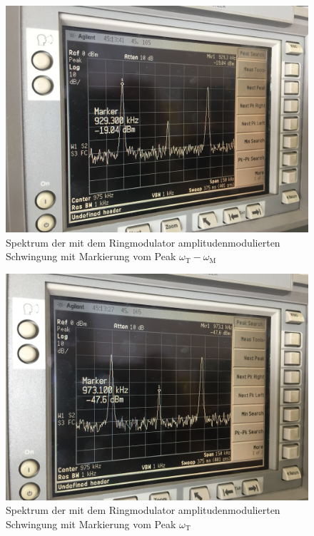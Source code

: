 \begin{figure}[h]
  \includegraphics[width=.9\textwidth]{Spektrum_Pics/b1.jpg}
  \caption{Spektrum der mit dem Ringmodulator amplitudenmodulierten Schwingung mit Markierung vom Peak $\omega_\text{T} - \omega_\text{M}$}
  \label{fig:b1}
\end{figure}
\begin{figure}[h]
  \includegraphics[width=.9\textwidth]{Spektrum_Pics/b2.jpg}
  \caption{Spektrum der mit dem Ringmodulator amplitudenmodulierten Schwingung mit Markierung vom Peak $\omega_\text{T}$}
  \label{fig:b2}
\end{figure}
